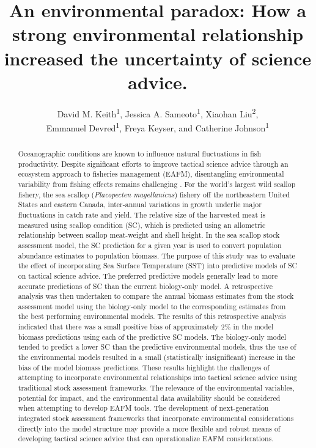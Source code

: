 \documentclass[
]{article}
\title{An environmental paradox: How a strong environmental relationship increased the uncertainty of science advice.}
\author{David M. Keith\textsuperscript{1},
Jessica A. Sameoto\textsuperscript{1},
Xiaohan Liu\textsuperscript{2},\\
Emmanuel Devred\textsuperscript{1},
Freya Keyser, and
Catherine Johnson\textsuperscript{1}}
\date{}
\begin{document}
\maketitle
\begin{abstract}
Oceanographic conditions are known to influence natural fluctuations in fish productivity. Despite significant efforts to improve tactical science advice through an ecosystem approach to fisheries management (EAFM), disentangling environmental variability from fishing effects remains challenging . For the world's largest wild scallop fishery, the sea scallop (\emph{Placopecten magellanicus}) fishery off the northeastern United States and eastern Canada, inter-annual variations in growth underlie major fluctuations in catch rate and yield. The relative size of the harvested meat is measured using scallop condition (SC), which is predicted using an allometric relationship between scallop meat-weight and shell height. In the sea scallop stock assessment model, the SC prediction for a given year is used to convert population abundance estimates to population biomass. The purpose of this study was to evaluate the effect of incorporating Sea Surface Temperature (SST) into predictive models of SC on tactical science advice. The preferred predictive models generally lead to more accurate predictions of SC than the current biology-only model. A retrospective analysis was then undertaken to compare the annual biomass estimates from the stock assessment model using the biology-only model to the corresponding estimates from the best performing environmental models. The results of this retrospective analysis indicated that there was a small positive bias of approximately 2\% in the model biomass predictions using each of the predictive SC models. The biology-only model tended to predict a lower SC than the predictive environmental models, thus the use of the environmental models resulted in a small (statistically insignificant) increase in the bias of the model biomass predictions. These results highlight the challenges of attempting to incorporate environmental relationships into tactical science advice using traditional stock assessment frameworks. The relevance of the environmental variables, potential for impact, and the environmental data availability should be considered when attempting to develop EAFM tools. The development of next-generation integrated stock assessment frameworks that incorporate environmental considerations directly into the model structure may provide a more flexible and robust means of developing tactical science advice that can operationalize EAFM considerations.
\end{abstract}
\end{document}

